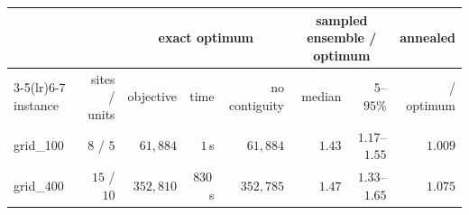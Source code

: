 \begin{tabular}{lrrrrrrr}
\toprule
 & & \multicolumn{3}{c}{exact optimum} & \multicolumn{2}{c}{sampled ensemble / optimum} & annealed \\
\cmidrule(lr){3-5}\cmidrule(lr){6-7}
instance & sites / units & objective & time & no contiguity & median & $5$--$95\%$ & / optimum \\
\midrule
grid\_100 & $8$ / $5$ & $61{,}884$ & $1$\,s & $61{,}884$ & $1.43$ & $1.17$--$1.55$ & $1.009$ \\
grid\_400 & $15$ / $10$ & $352{,}810$ & $830$\,s & $352{,}785$ & $1.47$ & $1.33$--$1.65$ & $1.075$ \\
\bottomrule
\end{tabular}
